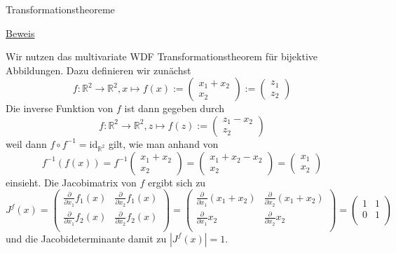 \documentclass[
  8pt,
  ignorenonframetext,
]{beamer}
\begin{document}
\begin{frame}{Transformationstheoreme}
\protect\hypertarget{transformationstheoreme-8}{}
\footnotesize

\underline{Beweis} \vspace{2mm}

Wir nutzen das multivariate WDF Transformationstheorem für bijektive
Abbildungen. Dazu definieren wir zunächst \begin{equation}
f : \mathbb{R}^2 \to \mathbb{R}^2, x \mapsto f(x) :=
\begin{pmatrix}
x_1 + x_2 \\
x_2
\end{pmatrix}
:=
\begin{pmatrix}
z_1 \\ z_2
\end{pmatrix}
\end{equation} Die inverse Funktion von \(f\) ist dann gegeben durch
\begin{equation}
f : \mathbb{R}^2 \to \mathbb{R}^2, z \mapsto f(z) :=
\begin{pmatrix}
z_1 - x_2 \\
z_2
\end{pmatrix}
\end{equation} weil dann \(f \circ f^{-1} = \mbox{id}_{\mathbb{R}^2}\)
gilt, wie man anhand von \begin{equation}
f^{-1}\left(f(x)\right)
=
f^{-1}
\begin{pmatrix}
x_1 + x_2 \\
x_2
\end{pmatrix}
=
\begin{pmatrix}
x_1 + x_2 - x_2\\
x_2
\end{pmatrix}
=
\begin{pmatrix}
x_1 \\
x_2
\end{pmatrix}
\end{equation} einsieht. Die Jacobimatrix von \(f\) ergibt sich zu
\begin{equation}
J^{f}(x) =
\begin{pmatrix}
\frac{\partial}{\partial x_1} f_1(x) &  \frac{\partial}{\partial x_2} f_1(x) \\
\frac{\partial}{\partial x_1} f_2(x) &  \frac{\partial}{\partial x_2} f_2(x) \\
\end{pmatrix}
=
\begin{pmatrix}
    \frac{\partial}{\partial x_1} (x_1 + x_2)
&   \frac{\partial}{\partial x_2} (x_1 + x_2)
\\
    \frac{\partial}{\partial x_1} x_2
&   \frac{\partial}{\partial x_2} x_2 \\
\end{pmatrix}
=
\begin{pmatrix}
1 &  1 \\
0 &  1 \\
\end{pmatrix}
\end{equation} und die Jacobideterminante damit zu \(|J^f(x)| = 1\).
\end{frame}
\end{document}
